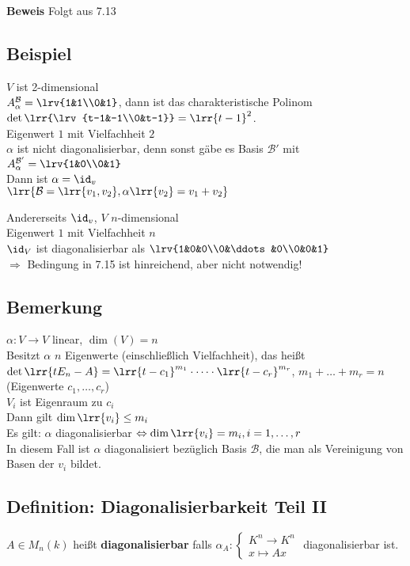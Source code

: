 	\textbf{Beweis} Folgt aus 7.13

\subsection{Beispiel}
	$V$ ist 2-dimensional\\
	$A_\alpha^\mathcal{B}=\lrv{1&1\\0&1}$, dann ist das charakteristische Polinom $\det\lrr{\lrv{t-1&-1\\0&t-1}}=\lrr{t-1}^2$.\\
	Eigenwert $1$ mit Vielfachheit $2$\\
	$\alpha$ ist nicht diagonalisierbar, denn sonst gäbe es Basis $\mathcal{B}'$ mit $A_\alpha^{\mathcal{B}'}=\lrv{1&0\\0&1}$\\
	Dann ist $\alpha=\id_v$\lightning\\
	$\lrr{\mathcal{B}=\lrr{v_1,v_2},\alpha\lrr{v_2}=v_1+v_2}$

	Andererseits $\id_v$, $V$ $n$-dimensional\\
	Eigenwert $1$ mit Vielfachheit $n$\\
	$\id_V$ ist diagonalisierbar als $\lrv{1&0&0\\0&\ddots&0\\0&0&1}$\\
	$\Rightarrow$ Bedingung in 7.15 ist hinreichend, aber nicht notwendig!

\subsection{Bemerkung}
	$\alpha:V\rightarrow V$ linear, $\dim(V)=n$\\
	Besitzt $\alpha$ $n$ Eigenwerte (einschließlich Vielfachheit), das heißt $\det\lrr{tE_n-A}=\lrr{t-c_1}^{m_1}\cdot\dots\cdot\lrr{t-c_r}^{m_r}$, $m_1+\dots+m_r=n$ (Eigenwerte $c_1,\dots,c_r$)\\
	$V_i$ ist Eigenraum zu $c_i$\\
	Dann gilt $\dim\lrr{v_i}\leq m_i$\\
	Es gilt: $\alpha$ diagonalisierbar $\Leftrightarrow\dim\lrr{v_i}=m_i, i=1,\dots, r$\\
	In diesem Fall ist $\alpha$ diagonalisiert bezüglich Basis $\mathcal{B}$, die man als Vereinigung von Basen der $v_i$ bildet.

\subsection{Definition: Diagonalisierbarkeit Teil II}
	$A\in M_n(k)$ heißt \textbf{diagonalisierbar} falls $\alpha_A:\begin{cases}K^n\rightarrow K^n\\x\mapsto Ax\end{cases}$ diagonalisierbar ist.

